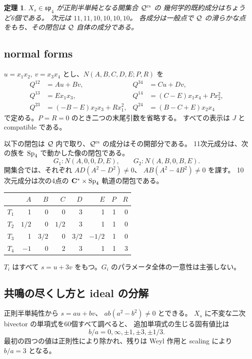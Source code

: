 \documentclass[11pt,a4paper]{ltjsarticle}
\newtheorem{theorem}{定理}[section]\newtheorem{proposition}[theorem]{命題}\newtheorem{lemma}[theorem]{補題}\newtheorem{corollary}[theorem]{系}
\theoremstyle{remark}\newtheorem{remark}[theorem]{注意}\renewcommand{\proofname}{証明}
\begin{document}
\begin{theorem}\label{thm:rs}
$X_s\in\mathfrak{sp}_4$ が正則半単純となる開集合 $\mathcal Q^{\rm rs}$ の
幾何学的既約成分はちょうど6個である。
次元は $11,11,10,10,10,10$。
各成分は一般点で $\mathcal Q$ の滑らかな点をもち、その閉包は $\mathcal Q$ 自体の成分である。
\end{theorem}

\subsection{normal forms}
$u=x_1x_2,\ v=x_3x_4$ とし、$N(A,B,C,D,E;P,R)$ を
\begin{align*}
 Q^{12}&=Au+Bv,& Q^{34}&=Cu+Dv,\\
 Q^{13}&=Ex_1x_3,& Q^{14}&=(C-E)x_1x_4+Px_2^2,\\
 Q^{23}&=(-B-E)x_2x_3+Rx_1^2,&
 Q^{24}&=(B-C+E)x_2x_4
\end{align*}
で定める。$P=R=0$ のとき二つの末尾引数を省略する。
すべての表示は $J$ と compatible である。

以下の閉包は $\mathcal Q$ 内で取り、$\mathcal Q^{\rm rs}$ の成分はその開部分である。
11次元成分は、次の族を $\operatorname{Sp}_4$ で動かした像の閉包である。
\[
 G_1:N(A,0,0,D,E),\qquad
 G_2:N(A,B,0,B,E).
\]
開集合では、それぞれ $AD(A^2-D^2)\ne0$、
$AB(A^2-4B^2)\ne0$ を課す。
10次元成分は次の4点の $\mathbf C^*\times\operatorname{Sp}_4$ 軌道の閉包である。
\begin{center}
\begin{tabular}{c rrrrrrr}
\toprule
 & $A$ &$B$ &$C$ &$D$ &$E$ &$P$ &$R$\\
\midrule
$T_1$&1&0&0&3&1&1&0\\
$T_2$&$1/2$&0&$1/2$&3&1&1&0\\
$T_3$&1&$3/2$&0&$3/2$&$-1/2$&1&0\\
$T_4$&$-1$&0&2&3&1&1&3\\
\bottomrule
\end{tabular}
\end{center}
$T_i$ はすべて $s=u+3v$ をもつ。$G_i$ のパラメータ全体の一意性は主張しない。

\subsection{共鳴の尽くし方と ideal の分解}
正則半単純性から $s=au+bv$、
$ab(a^2-b^2)\ne0$ とできる。
$X_s$ に不変な二次 bivector の単項式を60個すべて調べると、
追加単項式の生じる固有値比は
\[
 b/a=0,\infty,\pm1,\pm3,\pm1/3.
\]
最初の四つの値は正則性により除かれ、残りは Weyl 作用と scaling により $b/a=3$ となる。
\end{document}
